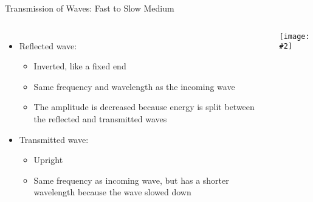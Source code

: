 \documentclass[12pt,aspectratio=169]{beamer}
\newcommand{\pic}[2]{\texttt{[image: \#2]}}
\begin{document}
\begin{frame}{Transmission of Waves: Fast to Slow Medium}
  \begin{columns}
    \begin{itemize}
    \item Reflected wave:
      \begin{itemize}
      \item Inverted, like a fixed end
      \item Same frequency and wavelength as the incoming wave
      \item The amplitude is decreased because energy is split between the
        reflected and transmitted waves
      \end{itemize}
    \item Transmitted wave:
      \begin{itemize}
      \item Upright
      \item Same frequency as incoming wave, but has a shorter wavelength
        because the wave slowed down
      \end{itemize}
    \end{itemize}
    
    \pic{1}{23.png}
  \end{columns}
\end{frame}
\end{document}
